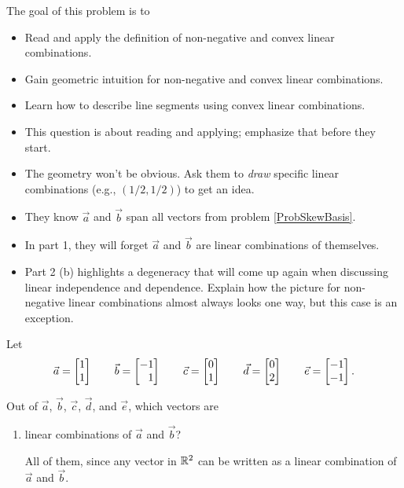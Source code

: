 \documentclass{workbook}
\newcommand{\displayonlynewpage}{\begin{displayonly}\newpage\end{displayonly}}
\begin{document}
\begin{slide}
	\displayonlynewpage

	\question
	\begin{annotation}
		\begin{goals}

			The goal of this problem is to
			\begin{itemize}
				\item Read and apply the definition of non-negative and convex
					linear combinations.
				\item Gain geometric intuition for non-negative and convex linear
					combinations.
				\item Learn how to describe line segments using
					convex linear combinations.
			\end{itemize}
		\end{goals}

		\begin{notes}
			\begin{itemize}
				\item This question is about reading and applying;
					emphasize that before they start.
				\item The geometry won't be obvious. Ask them to \emph{draw} specific
					linear combinations (e.g., $(1/2,1/2)$) to get an idea.
				\item They know $\vec a$ and $\vec b$ span all vectors from problem \ref{ProbSkewBasis}.
				\item In part 1, they will forget $\vec a$ and $\vec b$ are linear combinations of themselves.
				\item Part 2 (b) highlights a degeneracy that will come up again when discussing linear independence
					and dependence. Explain how the picture for non-negative linear combinations
					almost always looks one way, but this case is an exception.
			\end{itemize}
		\end{notes}
	\end{annotation}
	Let
	\[
		\vec a=\mat{1\\1} \qquad \vec b=\mat{-1\\1}\qquad \vec c=\mat{0\\1}\qquad\vec d=\mat{0\\2}\qquad\vec e=\mat{-1\\-1}.
	\]
	\begin{parts}
		\item Out of $\vec a$, $\vec b$, $\vec c$, $\vec d$, and $\vec e$, which
			vectors are
			\begin{enumerate}
				\item linear combinations of $\vec a$ and $\vec b$?
				\begin{solution}[inline]
					All of them, since any vector in $\mathbb{R}^2$ can be written as a linear combination
					of $\vec a$ and $\vec b$.
				\end{solution}


\end{enumerate}
\end{parts}
\end{slide}
\end{document}
